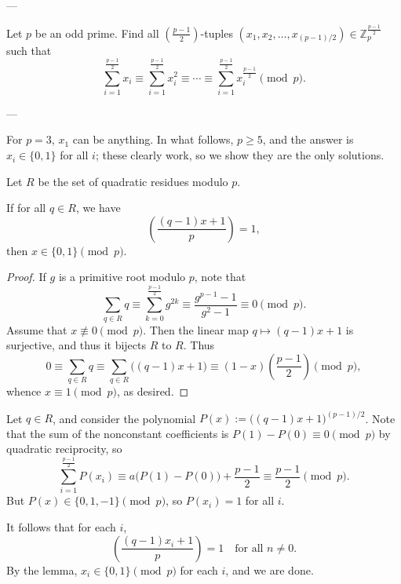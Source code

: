 
---

Let $p$ be an odd prime. Find all $\left(\tfrac{p-1}2\right)$-tuples $\left(x_1,x_2,\dots,x_{(p-1)/2}\right)\in\mathbb Z_p^{\frac{p-1}2}$ such that \[\sum_{i=1}^{\frac{p-1}2} x_i\equiv\sum_{i=1}^{\frac{p-1}2}x_i^2\equiv\cdots\equiv\sum_{i=1}^{\frac{p-1}2}x_i^{\frac{p-1}2}\pmod p.\]

---

For $p=3$, $x_1$ can be anything. In what follows, $p\ge5$, and the answer is $x_i\in\{0,1\}$ for all $i$; these clearly work, so we show they are the only solutions.

Let $R$ be the set of quadratic residues modulo $p$.
\begin{boxlemma*}
    If for all $q\in R$, we have \[\left(\frac{(q-1)x+1}p\right)=1,\]
    then $x\in\{0,1\}\pmod p$.
\end{boxlemma*}
\begin{proof}
    If $g$ is a primitive root modulo $p$, note that \[\sum_{q\in R}q\equiv\sum_{k=0}^{\frac{p-1}2}g^{2k}\equiv\frac{g^{p-1}-1}{g^2-1}\equiv0\pmod p.\]
    Assume that $x\not\equiv0\pmod p$. Then the linear map $q\mapsto(q-1)x+1$ is surjective, and thus it bijects $R$ to $R$. Thus \[0\equiv\sum_{q\in R}q\equiv\sum_{q\in R}\big((q-1)x+1\big)\equiv(1-x)\left(\frac{p-1}2\right)\pmod p,\]
    whence $x\equiv1\pmod p$, as desired.
\end{proof}

Let $q\in R$, and consider the polynomial $P(x):=\big( (q-1)x+1\big)^{(p-1)/2}$. Note that the sum of the nonconstant coefficients is $P(1)-P(0)\equiv0\pmod p$ by quadratic reciprocity, so \[\sum_{i=1}^{\frac{p-1}2}P(x_i)\equiv a\big(P(1)-P(0)\big)+\frac{p-1}2\equiv\frac{p-1}2\pmod p.\]
But $P(x)\in\{0,1,-1\}\pmod p$, so $P(x_i)=1$ for all $i$.

It follows that for each $i$, \[\left(\frac{(q-1)x_i+1}p\right)=1\quad\text{for all }n\ne0.\]
By the lemma, $x_i\in\{0,1\}\pmod p$ for each $i$, and we are done.

